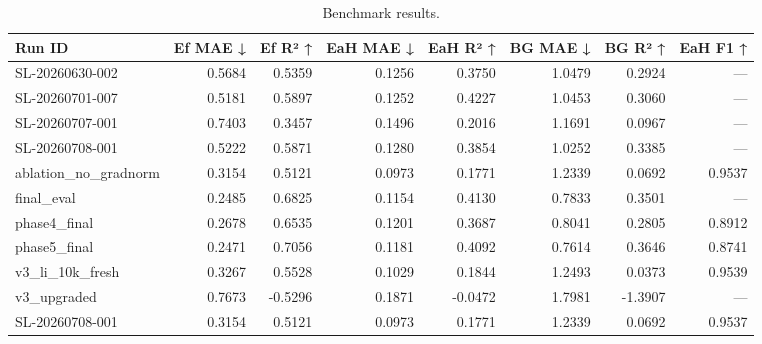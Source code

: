 \begin{table}[ht]
\centering
\begin{tabular}{lrrrrrrr}
\toprule
Run ID & Ef MAE ↓ & Ef R² ↑ & EaH MAE ↓ & EaH R² ↑ & BG MAE ↓ & BG R² ↑ & EaH F1 ↑ \\
\midrule
SL-20260630-002 & 0.5684 & 0.5359 & 0.1256 & 0.3750 & 1.0479 & 0.2924 & — \\
SL-20260701-007 & 0.5181 & 0.5897 & 0.1252 & 0.4227 & 1.0453 & 0.3060 & — \\
SL-20260707-001 & 0.7403 & 0.3457 & 0.1496 & 0.2016 & 1.1691 & 0.0967 & — \\
SL-20260708-001 & 0.5222 & 0.5871 & 0.1280 & 0.3854 & 1.0252 & 0.3385 & — \\
ablation_no_gradnorm & 0.3154 & 0.5121 & 0.0973 & 0.1771 & 1.2339 & 0.0692 & 0.9537 \\
final_eval & 0.2485 & 0.6825 & 0.1154 & 0.4130 & 0.7833 & 0.3501 & — \\
phase4_final & 0.2678 & 0.6535 & 0.1201 & 0.3687 & 0.8041 & 0.2805 & 0.8912 \\
phase5_final & 0.2471 & 0.7056 & 0.1181 & 0.4092 & 0.7614 & 0.3646 & 0.8741 \\
v3_li_10k_fresh & 0.3267 & 0.5528 & 0.1029 & 0.1844 & 1.2493 & 0.0373 & 0.9539 \\
v3_upgraded & 0.7673 & -0.5296 & 0.1871 & -0.0472 & 1.7981 & -1.3907 & — \\
SL-20260708-001 & 0.3154 & 0.5121 & 0.0973 & 0.1771 & 1.2339 & 0.0692 & 0.9537 \\
\bottomrule
\end{tabular}
\caption{Benchmark results.}
\label{tab:benchmark}
\end{table}